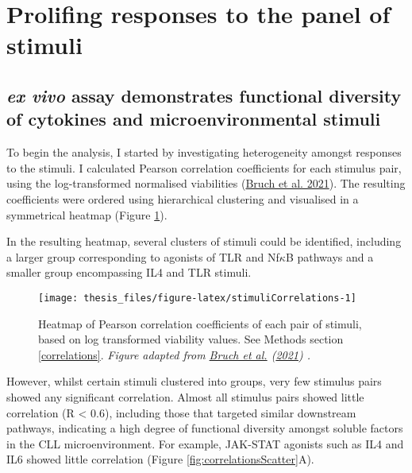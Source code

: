 \documentclass[11pt, a4paper, twosided]{book}
\begin{document}
\hypertarget{prolifing-responses-to-the-panel-of-stimuli}{%
\section{Prolifing responses to the panel of stimuli}\label{prolifing-responses-to-the-panel-of-stimuli}}

\hypertarget{cytokine-profiling}{%
\subsection{\texorpdfstring{\emph{ex vivo} assay demonstrates functional diversity of cytokines and microenvironmental stimuli}{ex vivo assay demonstrates functional diversity of cytokines and microenvironmental stimuli}}\label{cytokine-profiling}}

To begin the analysis, I started by investigating heterogeneity amongst responses to the stimuli. I calculated Pearson correlation coefficients for each stimulus pair, using the log-transformed normalised viabilities (\protect\hyperlink{ref-Giles2021}{Bruch et al. 2021}). The resulting coefficients were ordered using hierarchical clustering and visualised in a symmetrical heatmap (Figure \ref{fig:stimuliCorrelations}).

In the resulting heatmap, several clusters of stimuli could be identified, including a larger group corresponding to agonists of TLR and Nf\(\kappa\)B pathways and a smaller group encompassing IL4 and TLR stimuli.


\begin{figure}

{\centering \texttt{[image: thesis\_files/figure-latex/stimuliCorrelations-1]} 

}

\caption{Heatmap of Pearson correlation coefficients of each pair of stimuli, based on log transformed viability values. See Methods section \ref{correlations}. \emph{Figure adapted from \protect\hyperlink{ref-Giles2021}{Bruch et al.} (\protect\hyperlink{ref-Giles2021}{2021}) .}}\label{fig:stimuliCorrelations}
\end{figure}
However, whilst certain stimuli clustered into groups, very few stimulus pairs showed any significant correlation. Almost all stimulus pairs showed little correlation (R \textless{} 0.6), including those that targeted similar downstream pathways, indicating a high degree of functional diversity amongst soluble factors in the CLL microenvironment. For example, JAK-STAT agonists such as IL4 and IL6 showed little correlation (Figure \ref{fig:correlationsScatter}A).
\end{document}
